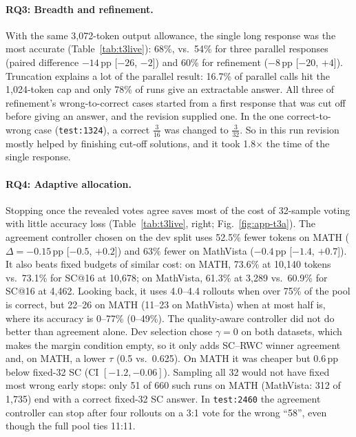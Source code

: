 \documentclass{article}
\newcommand{\pp}{\,pp}
\begin{document}
\paragraph{RQ3: Breadth and refinement.} With the same 3{,}072-token output allowance, the single long response was the most accurate (Table~\ref{tab:t3live}): 68\%, vs.\ 54\% for three parallel responses (paired difference $-14$\pp{} [$-26$, $-2$]) and 60\% for refinement ($-8$\pp{} [$-20$, $+4$]). Truncation explains a lot of the parallel result: 16.7\% of parallel calls hit the 1{,}024-token cap and only 78\% of runs give an extractable answer. All three of refinement's wrong-to-correct cases started from a first response that was cut off before giving an answer, and the revision supplied one. In the one correct-to-wrong case (\texttt{test:1324}), a correct $\tfrac{3}{16}$ was changed to $\tfrac{3}{32}$. So in this run revision mostly helped by finishing cut-off solutions, and it took 1.8$\times$ the time of the single response.

\paragraph{RQ4: Adaptive allocation.} Stopping once the revealed votes agree saves most of the cost of 32-sample voting with little accuracy loss (Table~\ref{tab:t3live}, right; Fig.~\ref{fig:app-t3a}). The agreement controller chosen on the dev split uses 52.5\% fewer tokens on MATH ($\Delta=-0.15$\pp{} [$-0.5$, $+0.2$]) and 63\% fewer on MathVista ($-0.4$\pp{} [$-1.4$, $+0.7$]). It also beats fixed budgets of similar cost: on MATH, 73.6\% at 10{,}140 tokens vs.\ 73.1\% for SC@16 at 10{,}678; on MathVista, 61.3\% at 3{,}289 vs.\ 60.9\% for SC@16 at 4{,}462. Looking back, it uses 4.0--4.4 rollouts when over 75\% of the pool is correct, but 22--26 on MATH (11--23 on MathVista) when at most half is, where its accuracy is 0--77\% (0--49\%). The quality-aware controller did not do better than agreement alone. Dev selection chose $\gamma=0$ on both datasets, which makes the margin condition empty, so it only adds SC--RWC winner agreement and, on MATH, a lower $\tau$ (0.5 vs.\ 0.625). On MATH it was cheaper but 0.6\pp{} below fixed-32 SC (CI $[-1.2, -0.06]$). Sampling all 32 would not have fixed most wrong early stops: only 51 of 660 such runs on MATH (MathVista: 312 of 1{,}735) end with a correct fixed-32 SC answer. In \texttt{test:2460} the agreement controller can stop after four rollouts on a 3:1 vote for the wrong ``58'', even though the full pool ties 11:11.
\end{document}
